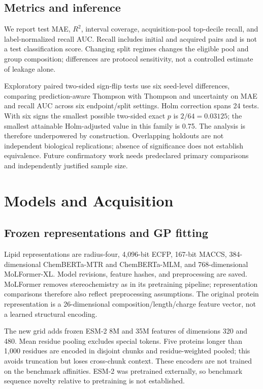 \documentclass[wcp]{jmlr}
\begin{document}
\subsection{Metrics and inference}
We report test MAE, $R^2$, interval coverage, acquisition-pool top-decile
recall, and label-normalized recall AUC. Recall includes initial and acquired
pairs and is not a test classification score. Changing split regimes changes
the eligible pool and group composition; differences are protocol sensitivity,
not a controlled estimate of leakage alone.

Exploratory paired two-sided sign-flip tests use six seed-level differences,
comparing prediction-aware Thompson with Thompson and uncertainty on MAE and
recall AUC across six endpoint/split settings. Holm correction spans 24 tests.
With six signs the smallest possible two-sided exact $p$ is $2/64=0.03125$;
the smallest attainable Holm-adjusted value in this family is 0.75. The
analysis is therefore underpowered by construction. Overlapping holdouts are
not independent biological replications; absence of significance does not
establish equivalence. Future confirmatory work needs predeclared primary
comparisons and independently justified sample size.

\section{Models and Acquisition}
\subsection{Frozen representations and GP fitting}
Lipid representations are radius-four, 4,096-bit ECFP, 167-bit MACCS,
384-dimensional ChemBERTa-MTR and ChemBERTa-MLM, and 768-dimensional
MoLFormer-XL. Model revisions, feature hashes, and preprocessing are saved.
MoLFormer removes stereochemistry as in its pretraining pipeline; representation
comparisons therefore also reflect preprocessing assumptions. The original
protein representation is a 26-dimensional composition/length/charge feature
vector, not a learned structural encoding.

The new grid adds frozen ESM-2 8M and 35M features of dimensions 320 and 480.
Mean residue pooling excludes special tokens. Five proteins longer than
1,000 residues are encoded in disjoint chunks and residue-weighted pooled;
this avoids truncation but loses cross-chunk context. These encoders are not
trained on the benchmark affinities. ESM-2 was pretrained externally, so
benchmark sequence novelty relative to pretraining is not established.
\end{document}

